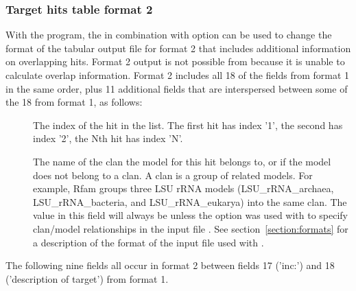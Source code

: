 \subsubsection{Target hits table format 2}
\label{tabular-format2}

With the  program, the  in combination with
 option can be used to change the format of the
tabular output file for format 2 that includes additional information
on overlapping hits. Format 2 output is not possible from
 because it is unable to calculate overlap information.
Format 2 includes all 18 of the fields from format 1 in the same order, plus 11
additional fields that are interspersed between some of the 18 from
format 1, as follows:

\begin{description}

\item[] 
  The index of the hit in the list. The first hit has index '1', the
  second has index '2', the Nth hit has index 'N'.

\item[] 
  The name of the clan the model for this hit belongs to, or \ccode{-} if
  the model does not belong to a clan. A clan is a group of related
  models. For example, Rfam groups three LSU rRNA models
  (LSU\_rRNA\_archaea, LSU\_rRNA\_bacteria, and LSU\_rRNA\_eukarya)
  into the same clan. The value in this field will always be \ccode{-}
  unless the  option was used with
   to specify clan/model relationships in the input file
  . See section~\ref{section:formats} for a description of
  the format of the input file used with .

\end{description}

The following nine fields all occur in format 2 between fields 17
('inc:') and 18 ('description of target') from format 1. 

